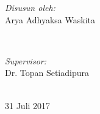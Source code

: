 \begin{titlepage}
 

\begin{minipage}{0.4\textwidth}
\begin{flushleft} \large
\emph{Disusun oleh:}\\
Arya Adhyaksa Waskita
\end{flushleft}
\end{minipage}
~
\begin{minipage}{0.4\textwidth}
\begin{flushright} \large
\emph{Supervisor:} \\
Dr. Topan Setiadipura
\end{flushright}
\end{minipage}\\[4cm]



{\large 31 Juli 2017}\\[3cm] %
 

\vfill %

\end{titlepage}
